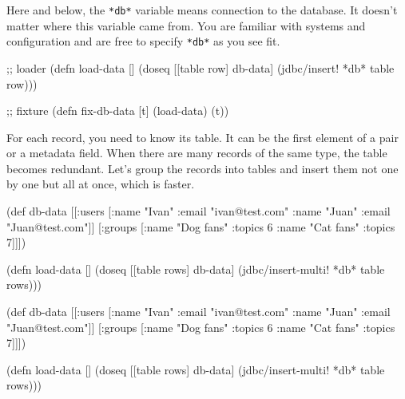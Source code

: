 \fi


Here and below, the \verb|*db*| variable means connection to the database. It doesn't matter where this variable came from. You are familiar with systems and configuration and are free to specify \verb|*db*| as you see fit.

\begin{english}
  \begin{clojure}
;; loader
(defn load-data []
  (doseq [[table row] db-data]
    (jdbc/insert! *db* table row)))

;; fixture
(defn fix-db-data [t]
  (load-data)
  (t))
  \end{clojure}
\end{english}

For each record, you need to know its table. It can be the first element of a  pair or a metadata field. When there are many records of the same type, the table becomes redundant. Let's group the records into tables and insert them not one by one but all at once, which is faster.


\ifx\DEVICETYPE\MOBILE

\begin{english}
  \begin{clojure}
(def db-data
  [[:users [{:name "Ivan"
             :email "ivan@test.com"}
            {:name "Juan"
             :email "Juan@test.com"}]]
  [:groups [{:name "Dog fans"
             :topics 6}
            {:name "Cat fans"
             :topics 7}]]])

(defn load-data []
 (doseq [[table rows] db-data]
  (jdbc/insert-multi! *db* table rows)))
  \end{clojure}
\end{english}

\else

\begin{english}
  \begin{clojure}
(def db-data
  [[:users [{:name "Ivan" :email "ivan@test.com"}
            {:name "Juan" :email "Juan@test.com"}]]
   [:groups [{:name "Dog fans" :topics 6}
             {:name "Cat fans" :topics 7}]]])

(defn load-data []
  (doseq [[table rows] db-data]
    (jdbc/insert-multi! *db* table rows)))
  \end{clojure}
\end{english}

